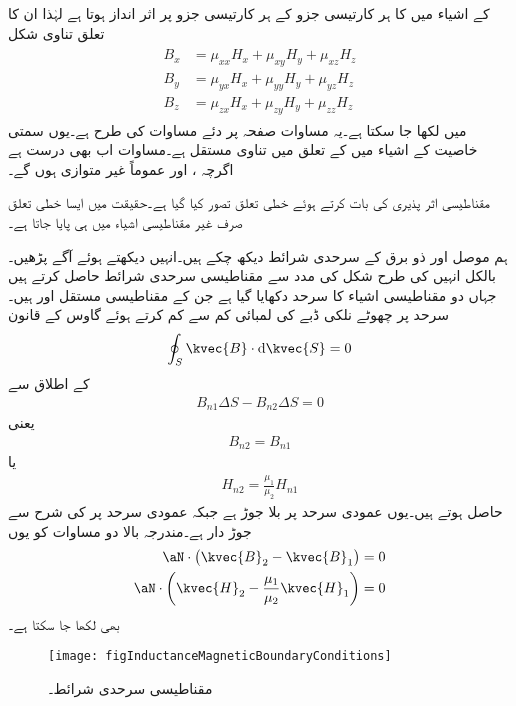  کے اشیاء میں  کا ہر کارتیسی جزو  کے ہر کارتیسی جزو پر اثر انداز ہوتا ہے لہٰذا ان کا تعلق تناوی شکل
\begin{gather}
\begin{aligned}\label{مساوت_امالہ_تناوی-مساوات}
B_x&=\mu_{xx} H_x +\mu_{xy} H_y+\mu_{xz} H_z\\
B_y&=\mu_{yx} H_x +\mu_{yy} H_y+\mu_{yz} H_z\\
B_z&=\mu_{zx} H_x +\mu_{zy} H_y+\mu_{zz} H_z
\end{aligned}
\end{gather}
میں لکھا جا سکتا ہے۔یہ مساوات صفحہ  پر دئے مساوات  کی طرح ہے۔یوں سمتی خاصیت کے اشیاء میں  کے تعلق میں  تناوی مستقل ہے۔مساوات  اب بھی درست ہے اگرچہ ،  اور  عموماً غیر متوازی ہوں گے۔

مقناطیسی اثر پذیری کی بات کرتے ہوئے خطی تعلق تصور کیا گیا ہے۔حقیقت میں ایسا خطی تعلق صرف غیر مقناطیسی اشیاء میں ہی پایا جاتا ہے۔


ہم موصل اور ذو برق کے سرحدی شرائط دیکھ چکے ہیں۔انہیں دیکھتے ہوئے آگے پڑھیں۔بالکل انہیں کی طرح شکل  کی مدد سے مقناطیسی سرحدی شرائط حاصل کرتے ہیں جہاں دو مقناطیسی اشیاء کا سرحد دکھایا گیا ہے جن کے مقناطیسی مستقل  اور  ہیں۔ سرحد پر چھوٹے نلکی ڈبے کی لمبائی کم سے کم کرتے ہوئے گاوس کے قانون
\begin{align*}
\oint_S \kvec{B} \cdot \dif \kvec{S}=0
\end{align*}
کے اطلاق سے
\begin{align*}
B_{n1}\Delta S-B_{n2} \Delta S=0
\end{align*}
یعنی
\begin{align}\label{مساوات_امالہ_عمودی_مقناطیسی_میدان_بے_جوڑ_ہے}
B_{n2}=B_{n1}
\end{align}
یا
\begin{align}
H_{n2}=\frac{\mu_1}{\mu_2} H_{n1}
\end{align}
حاصل ہوتے ہیں۔یوں عمودی  سرحد پر بلا جوڑ ہے جبکہ عمودی  سرحد پر  کی شرح سے جوڑ دار ہے۔مندرجہ بالا دو مساوات کو یوں
\begin{align}
\aN  \cdot \left(\kvec{B}_2-\kvec{B}_1 \right)&=0\\
\aN \cdot \left(\kvec{H}_2-\frac{\mu_1}{\mu_2} \kvec{H}_1 \right)&=0
\end{align}
بھی لکھا جا سکتا ہے۔
 \begin{figure}
\centering
\texttt{[image: figInductanceMagneticBoundaryConditions]}
\caption{مقناطیسی سرحدی شرائط۔}
\label{شکل_امالہ_مقناطیسی_سرحدی_شرائط}
\end{figure}


